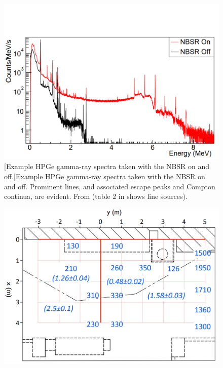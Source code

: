 \begin{figure}[!h]
\centering
\begin{minipage}{.45\textwidth}
  \centering
  \includegraphics[width=\linewidth]{Chapter2/Figs/Raster/Prospect_NSBR_gammaSpec.png}
  [Example HPGe gamma-ray spectra taken with the NBSR on and off.]{Example HPGe gamma-ray spectra taken with the NBSR on and off. Prominent lines, and associated escape peaks and Compton continua, are evident. From \cite{Ashenfelter_2016} (table 2 in \cite{Ashenfelter_2016} shows line sources).} 
  \label{fig:Prospect_NSBR_gammaSpec}
  \vspace{1.912cm} %
\end{minipage}%
\qquad
\begin{minipage}{.45\textwidth}
  \centering
  \includegraphics[width=\linewidth]{Chapter2/Figs/Raster/prospectNeutronMap.png} 

\end{minipage}
\end{figure}
